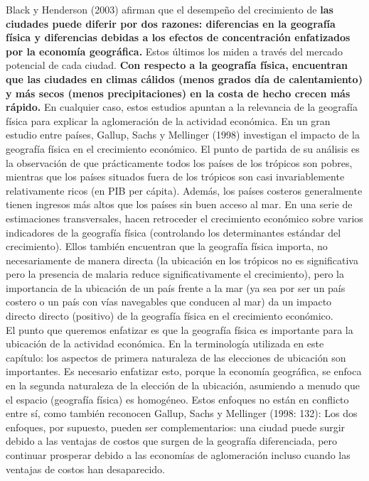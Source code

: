 Black y Henderson (2003) afirman que el desempeño del crecimiento de \textbf{las ciudades puede diferir por dos razones: diferencias en la geografía física y diferencias debidas a los efectos de concentración enfatizados por la economía geográfica.} Estos últimos los miden a través del mercado potencial de cada ciudad.  \textbf{Con respecto a la geografía física, encuentran que las ciudades en climas cálidos (menos grados día de calentamiento) y más secos (menos precipitaciones) en la costa de hecho crecen más rápido.} En cualquier caso, estos estudios apuntan a la relevancia de la geografía física para explicar la aglomeración de la actividad económica. En un gran estudio entre países, Gallup, Sachs y Mellinger (1998) investigan el impacto de la geografía física en el crecimiento económico. El punto de partida de su análisis es la observación de que prácticamente todos los países de los trópicos son pobres, mientras que los países situados fuera de los trópicos son casi invariablemente relativamente ricos (en PIB per cápita). Además, los países costeros generalmente tienen ingresos más altos que los países sin buen acceso al mar. En una serie de estimaciones transversales, hacen retroceder el crecimiento económico sobre varios indicadores de la geografía física (controlando los determinantes estándar del crecimiento). Ellos también encuentran que la geografía física importa, no necesariamente de manera directa (la ubicación en los trópicos no es significativa pero la presencia de malaria reduce significativamente el crecimiento), pero la importancia de la ubicación de un país frente a la mar (ya sea por ser un país costero o un país con vías navegables que conducen al mar) da un impacto directo directo (positivo) de la geografía física en el crecimiento económico.\\
El punto que queremos enfatizar es que la geografía física es importante para la ubicación de la actividad económica. En la terminología utilizada en este capítulo: los aspectos de primera naturaleza de las elecciones de ubicación son importantes. Es necesario enfatizar esto, porque la economía geográfica,  se enfoca en la segunda naturaleza de la elección de la ubicación, asumiendo a menudo que el espacio (geografía física) es homogéneo. Estos enfoques no están en conflicto entre sí, como también reconocen Gallup, Sachs y Mellinger (1998: 132): Los dos enfoques, por supuesto, pueden ser complementarios: una ciudad puede surgir debido a las ventajas de costos que surgen de la geografía diferenciada, pero continuar prosperar debido a las economías de aglomeración incluso cuando las ventajas de costos han desaparecido.

